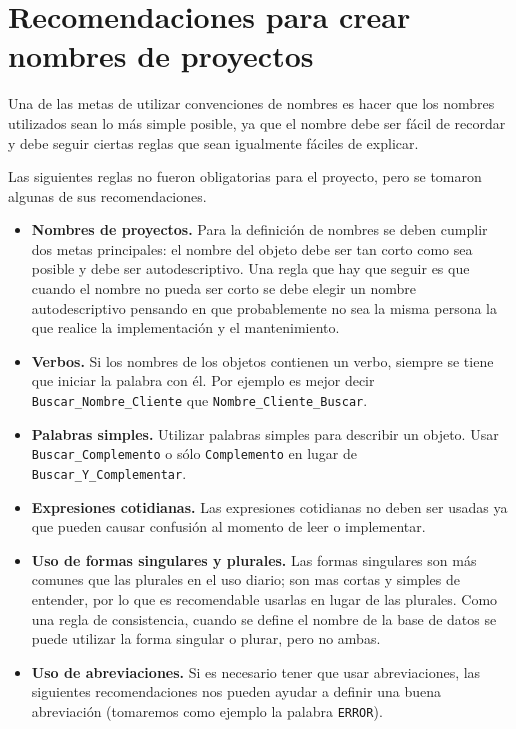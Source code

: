 \section{Recomendaciones para crear nombres de proyectos}

Una de las metas de utilizar convenciones de nombres es hacer que los nombres
utilizados sean lo más simple posible, ya que el nombre debe ser fácil de
recordar y debe seguir ciertas reglas que sean igualmente fáciles de explicar.

Las siguientes reglas no fueron obligatorias para el proyecto, pero se tomaron
algunas de sus recomendaciones.

\begin{itemize}

\item \textbf{Nombres de proyectos.} Para la definición de nombres se deben
  cumplir dos metas principales: el nombre del objeto debe ser tan corto como
  sea posible y debe ser autodescriptivo. Una regla que hay que seguir es que
  cuando el nombre no pueda ser corto se debe elegir un nombre autodescriptivo
  pensando en que probablemente no sea la misma persona la que realice la
  implementación y el mantenimiento.

\item \textbf{Verbos.} Si los nombres de los objetos contienen un verbo, siempre
  se tiene que iniciar la palabra con él. Por ejemplo es mejor decir
  \texttt{Buscar\_Nombre\_Cliente} que \texttt{Nombre\_Cliente\_Buscar}.

\item \textbf{Palabras simples.} Utilizar palabras simples para describir un
  objeto. Usar \texttt{Buscar\_Complemento} o sólo \texttt{Complemento} en lugar
  de \texttt{Buscar\_Y\-\_Complementar}.

\item \textbf{Expresiones cotidianas.} Las expresiones cotidianas no deben ser
  usadas ya que pueden causar confusión al momento de leer o implementar.

\item \textbf{Uso de formas singulares y plurales.} Las formas singulares son
  más comunes que las plurales en el uso diario; son mas cortas y simples de
  entender, por lo que es recomendable usarlas en lugar de las plurales. Como
  una regla de consistencia, cuando se define el nombre de la base de datos se
  puede utilizar la forma singular o plurar, pero no ambas.

\item \textbf{Uso de abreviaciones.} Si es necesario tener que usar
  abreviaciones, las siguientes recomendaciones nos pueden ayudar a definir una
  buena abreviación (tomaremos como ejemplo la palabra \texttt{ERROR}).


\end{itemize}
